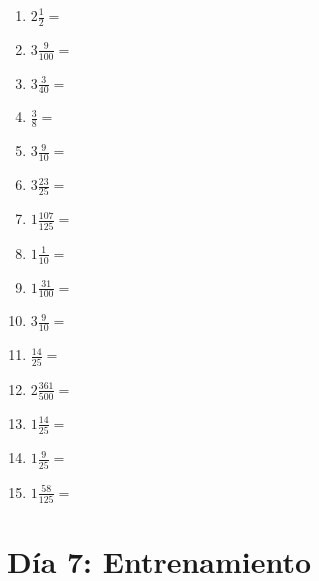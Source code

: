 \documentclass[12pt]{article}
\begin{document}
\begin{enumerate}
\item \large $ 2 \frac{1}{2} = $ \vspace{1.5cm}
\item \large $ 3 \frac{9}{100} = $ \vspace{1.5cm}
\item \large $ 3 \frac{3}{40} = $ \vspace{1.5cm}
\item \large $ \frac{3}{8} = $ \vspace{1.5cm}
\item \large $ 3 \frac{9}{10} = $ \vspace{1.5cm}
\newpage
\item \large $ 3 \frac{23}{25} = $ \vspace{1.5cm}
\item \large $ 1 \frac{107}{125} = $ \vspace{1.5cm}
\item \large $ 1 \frac{1}{10} = $ \vspace{1.5cm}
\item \large $ 1 \frac{31}{100} = $ \vspace{1.5cm}
\item \large $ 3 \frac{9}{10} = $ \vspace{1.5cm}
\item \large $ \frac{14}{25} = $ \vspace{1.5cm}
\item \large $ 2 \frac{361}{500} = $ \vspace{1.5cm}
\item \large $ 1 \frac{14}{25} = $ \vspace{1.5cm}
\item \large $ 1 \frac{9}{25} = $ \vspace{1.5cm}
\item \large $ 1 \frac{58}{125} = $ \vspace{1.5cm}
\end{enumerate}\newpage
\section*{Día 7: Entrenamiento}
\end{document}
